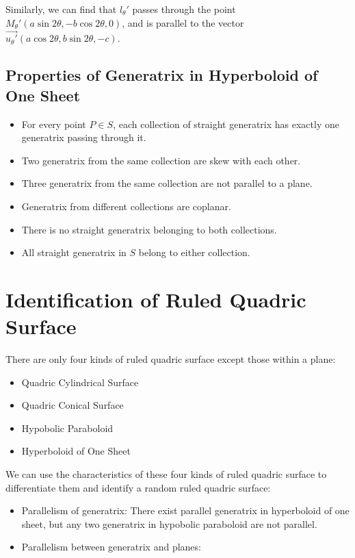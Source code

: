 \documentclass[onecolumn]{ctexart}
\begin{document}
Similarly, we can find that $l_\theta'$ passes through the point $M_\theta'
(a\sin2\theta, -b\cos2\theta, 0)$, and is parallel to the vector 
$\vec{u_\theta'}(a\cos2\theta, b\sin2\theta, -c)$.

\subsection{Properties of Generatrix in Hyperboloid of One Sheet}
\begin{itemize}
  \item For every point $P \in S$, each collection of straight generatrix has 
  exactly one generatrix passing through it.
  \item Two generatrix from the same collection are skew with each other.
  \item Three generatrix from the same collection are not parallel to a plane.
  \item Generatrix from different collections are coplanar.
  \item There is no straight generatrix belonging to both collections.
  \item All straight generatrix in $S$ belong to either collection.
\end{itemize}

\section{Identification of Ruled Quadric Surface}

There are only four kinds of ruled quadric surface except those within a plane:
\begin{itemize}
  \item Quadric Cylindrical Surface
  \item Quadric Conical Surface
  \item Hypobolic Paraboloid
  \item Hyperboloid of One Sheet
\end{itemize}

We can use the characteristics of these four kinds of ruled quadric surface to 
differentiate them and identify a random ruled quadric surface:
\begin{itemize}
  \item Parallelism of generatrix: There exist parallel generatrix in 
  hyperboloid of one sheet, but any two generatrix in hypobolic paraboloid are 
  not parallel.
  \item Parallelism between generatrix and planes: 
\end{itemize}
\end{document}
